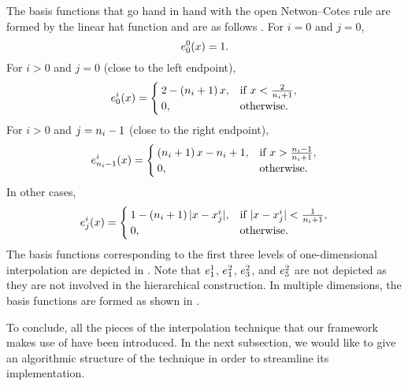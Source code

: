 
The basis functions that go hand in hand with the open Netwon--Cotes rule are
formed by the linear hat function and are as follows \cite{klimke2006}. For $i =
0$ and $j = 0$,
\[
  e^0_0(x) = 1.
\]
For $i > 0$ and $j = 0$ (close to the left endpoint),
\[
  e^i_0(x) = \begin{cases}
    2 - \left( n_i + 1 \right) x, & \text{if } x < \frac{2}{n_i + 1}, \\
    0, & \text{otherwise}.
  \end{cases}
\]
For $i > 0$ and $j = n_i - 1$ (close to the right endpoint),
\[
  e^i_{n_i - 1}(x) = \begin{cases}
    \left( n_i + 1 \right) x - n_i + 1, & \text{if } x > \frac{n_i - 1}{n_i + 1}, \\
    0, & \text{otherwise}.
  \end{cases}
\]
In other cases,
\[
  e^i_j(x) = \begin{cases}
    1 - \left( n_i + 1 \right)|x - x^i_j|, & \text{if } |x - x^i_j| < \frac{1}{n_i + 1}, \\
    0, & \text{otherwise}.
  \end{cases}
\]
The basis functions corresponding to the first three levels of one-dimensional
interpolation are depicted in . Note that $e^1_1$, $e^2_1$,
$e^2_3$, and $e^2_5$ are not depicted as they are not involved in the
hierarchical construction. In multiple dimensions, the basis functions are
formed as shown in .

To conclude, all the pieces of the interpolation technique that our framework
makes use of have been introduced. In the next subsection, we would like to give
an algorithmic structure of the technique in order to streamline its
implementation.
